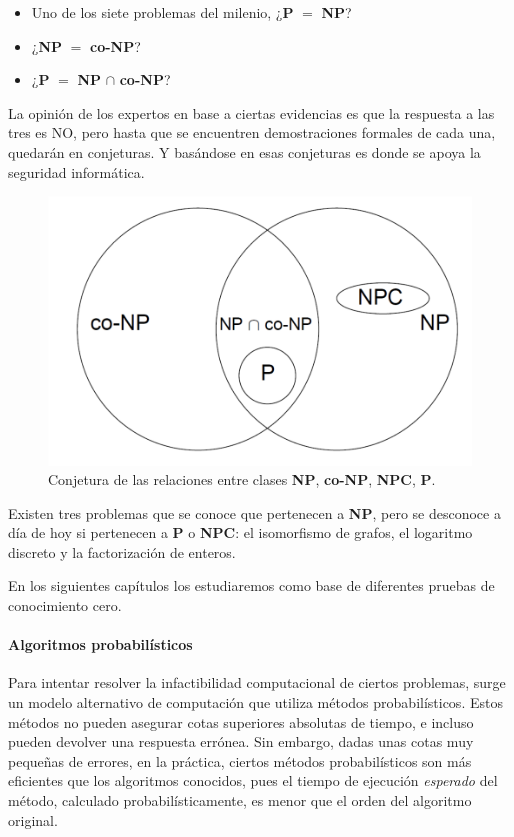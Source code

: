 \begin{itemize}
	\item Uno de los siete problemas del milenio, ¿\textbf{P} $=$ \textbf{NP}?
	\item ¿\textbf{NP} $=$ \textbf{co-NP}?
	\item ¿\textbf{P} $=$ \textbf{NP} $\cap$ \textbf{co-NP}?
\end{itemize}


La opinión de los expertos en base a ciertas evidencias es que la respuesta a las tres es NO, pero hasta que se encuentren demostraciones formales de cada una, quedarán en conjeturas. Y basándose en esas conjeturas es donde se apoya la seguridad informática.


\begin{figure}[bth]
	\begin{center}
		\includegraphics[width=.45\linewidth]{gfx/NPclasses}
	\end{center}
	\caption{Conjetura de las relaciones entre clases \textbf{NP}, \textbf{co-NP}, \textbf{NPC}, \textbf{P}.}
	\label{fig:NPclasses}
\end{figure}


Existen tres problemas que se conoce que pertenecen a \textbf{NP}, pero se desconoce a día de hoy si pertenecen a \textbf{P} o \textbf{NPC}: el isomorfismo de grafos, el logaritmo discreto y la factorización de enteros.

En los siguientes capítulos los estudiaremos como base de diferentes pruebas de conocimiento cero.


\hfil


\paragraph{Algoritmos probabilísticos} 

\hfil

Para intentar resolver la infactibilidad computacional de ciertos problemas, surge un modelo alternativo de computación que utiliza métodos probabilísticos. Estos métodos no pueden asegurar cotas superiores absolutas de tiempo, e incluso pueden devolver una respuesta errónea. Sin embargo, dadas unas cotas muy pequeñas de errores, en la práctica, ciertos métodos probabilísticos son más eficientes que los algoritmos conocidos, pues el tiempo de ejecución \textit{esperado} del método, calculado probabilísticamente, es menor que el orden del algoritmo original.


